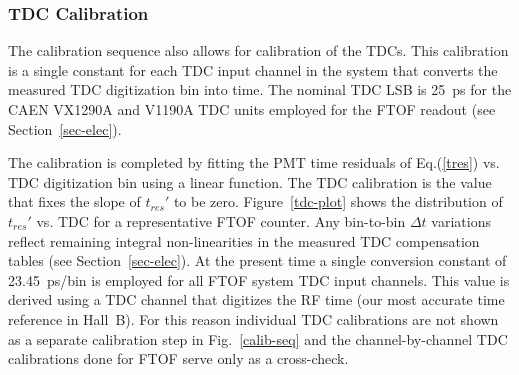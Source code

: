 \documentclass{elsart}
\begin{document}
\subsubsection{TDC Calibration}
\label{sec-tdccal}

The calibration sequence also allows for calibration of the TDCs. This calibration is a single constant for
each TDC input channel in the system that converts the measured TDC digitization bin into time. The nominal
TDC LSB is 25~ps for the CAEN VX1290A and V1190A TDC units employed for the FTOF readout (see
Section~\ref{sec-elec}).

The calibration is completed by fitting the PMT time residuals of Eq.(\ref{tres}) vs. TDC digitization bin using
a linear function. The TDC calibration is the value that fixes the slope of $t_{res}'$ to be zero.
Figure~\ref{tdc-plot} shows the distribution of $t_{res}'$ vs. TDC for a representative FTOF counter.
Any bin-to-bin $\Delta t$ variations reflect remaining integral non-linearities in the measured TDC
compensation tables (see Section~\ref{sec-elec}). At the present time a single conversion constant
of 23.45~ps/bin is employed for all FTOF system TDC input channels. This value is derived using a TDC channel
that digitizes the RF time (our most accurate time reference in Hall~B). For this reason individual TDC
calibrations are not shown as a separate calibration step in Fig.~\ref{calib-seq} and the channel-by-channel TDC
calibrations done for FTOF serve only as a cross-check. 
\end{document}
